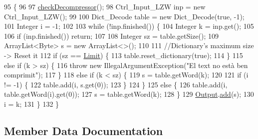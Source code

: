 \begin{DoxyCode}
95                                \{
96 
97         \hyperlink{classdomini_1_1algorithm_1_1Algorithm_a6b738342cc7169893fa60d593f5a13db}{checkDecompressor}();
98         Ctrl\_Input\_LZW inp = \textcolor{keyword}{new} Ctrl\_Input\_LZW();
99         
100         Dict\_Decode table = \textcolor{keyword}{new} Dict\_Decode(\textcolor{keyword}{true}, -1);
101         Integer i = -1;
102         
103         \textcolor{keywordflow}{while} (!inp.finished()) \{
104             Integer k = inp.get();
105             
106             \textcolor{keywordflow}{if} (inp.finished()) \textcolor{keywordflow}{return};
107             
108             Integer sz = table.getSize();
109             ArrayList<Byte> s = \textcolor{keyword}{new} ArrayList<>();
110 
111             \textcolor{comment}{//Dictionary's maximum size -> Reset it}
112             \textcolor{keywordflow}{if} (sz == \hyperlink{classdomini_1_1algorithm_1_1LZW_a6d83dbcda4939db767fa0522d40fcc0a}{Limit}) \{ 
113                 table.reset\_dictionary(\textcolor{keyword}{true});
114             \}               
115             \textcolor{keywordflow}{else} \textcolor{keywordflow}{if} (k > sz) \{
116                 \textcolor{keywordflow}{throw} \textcolor{keyword}{new} IllegalArgumentException(\textcolor{stringliteral}{"El text no està ben comprimit"});
117             \}       
118             \textcolor{keywordflow}{else} \textcolor{keywordflow}{if} (k < sz) \{
119                 s = table.getWord(k);
120 
121                 \textcolor{keywordflow}{if} (i != -1) \{
122                     table.add(i, s.get(0));
123                 \}
124             \}
125             \textcolor{keywordflow}{else} \{
126                 table.add(i, table.getWord(i).get(0));
127                 s = table.getWord(k);
128             \}
129             \hyperlink{classdomini_1_1algorithm_1_1Algorithm_a4de9955411c656325adc391ef570c082}{Output}.\hyperlink{classpersistencia_1_1output_1_1Ctrl__Output_a8c5aa5a6acb5259faeb1c05c71ddd21c}{add}(s);
130             i = k;
131         \}
132     \}
\end{DoxyCode}


\subsection{Member Data Documentation}
\mbox{\label{classdomini_1_1algorithm_1_1LZW_a6d83dbcda4939db767fa0522d40fcc0a}} 
